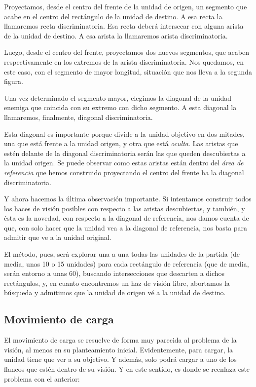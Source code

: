 \begin{minipage}[h]{0.6\columnwidth}
Proyectamos, desde el centro del frente de la unidad de origen, un
segmento que acabe en el centro del rectángulo de la unidad de
destino. A esa recta la llamaremos recta discriminatoria. Esa recta
deberá intersecar con alguna arista de la unidad de
destino. A esa arista la llamaremos arista discriminatoria.

Luego, desde el centro del frente, proyectamos dos nuevos segmentos,
que acaben respectivamente en los extremos de la arista
discriminatoria. Nos quedamos, en este caso, con el segmento de mayor
longitud, situación que nos lleva a la segunda figura.

Una vez determinado el segmento mayor, elegimos la diagonal de la
unidad enemiga que coincida con su extremo con dicho segmento. A esta
diagonal la llamaremos, finalmente, diagonal discriminatoria.

Esta diagonal es importante porque divide a la unidad objetivo en dos
mitades, una que está frente a la unidad origen, y otra que
está \emph{oculta}. Las aristas que estén delante de la diagonal
discriminatoria serán las que queden descubiertas a la unidad
origen. Se puede observar como estas aristas están dentro del
\emph{área de referencia} que hemos construido proyectando el centro
del frente ha la diagonal discriminatoria.
\end{minipage}

Y ahora hacemos la última observación importante. Si intentamos
construir todos los haces de visión posibles con respecto a las
aristas descubiertas, y también, y ésta es la novedad, con respecto a la diagonal de
referencia, nos damos cuenta de que, con solo hacer que la unidad vea
a la diagonal de referencia, nos basta para admitir que ve a la unidad
original.

El método, pues, será explorar una a una todas las unidades de la
partida (de media, unas 10 o 15 unidades)
para cada rectángulo de referencia (que de media, serán entorno a unas
60), buscando intersecciones que descarten a dichos rectángulos, y, en
cuanto encontremos un haz de visión libre, abortamos la búsqueda y
admitimos que la unidad de origen vé a la unidad de destino.

\subsection{Movimiento de carga}
El movimiento de carga se resuelve de forma muy parecida al problema
de la visión, al menos en su planteamiento inicial. Evidentemente,
para cargar, la unidad tiene que ver a su objetivo. Y además, solo
podrá cargar a uno de los flancos que estén dentro de su 
visión. Y en este sentido, es donde se reenlaza este problema con el
anterior:

